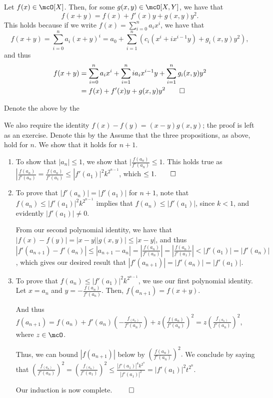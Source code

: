 \documentclass[a4paper, 12pt,oneside,openany]{book}
\begin{document}
Let $f(x) \in \mcO[X]$. Then, for some $g(x, y) \in \mcO[X, Y]$, we have that $$f(x+y)=f(x)+f'(x)y+g(x, y)y^2.$$ This holds because if we write $f(x)=\sum\limits_{i=0}^n a_ix^i$, we have that $$f(x+y)=\sum\limits_{i=0}^n a_i(x+y)^i = a_0+\sum\limits_{i=1}^n (c_i(x^i+ix^{i-1}y)+g_i(x, y)y^2),$$ and thus 
\begin{align*} f(x+y)&=\sum\limits_{i=0}^n a_i x^i+ \sum\limits_{i=1}^n ia_i x^{i-1} y + \sum\limits_{i=1}^n g_i (x, y) y^2 \\ &= f(x)+f'(x)y+g(x, y) y^2 \qed\end{align*} 

Denote the above by the 

We also require the identity $f(x)-f(y)=(x-y)g(x, y)$; the proof is left as an exercise. Denote this by the  Assume that the three propositions, as above, hold for $n$. We show that it holds for $n+1$. 

\begin{enumerate}
\item To show that $|a_n| \leq 1$, we show that $|\frac{f(a_n)}{f'(a_n)}\leq 1$. This holds true as $|\frac{f(a_n)}{f'(a_n)}=\frac{f(a_n)}{f'(a_1)}\leq|f'(a_1)|^2 k^{2^{n-1}}$, which $\leq 1. \qed$
\item To prove that $|f'(a_n)|=|f'(a_1)|$ for $n+1$, note that $f(a_n) \leq |f'(a_1)|^2 k^{2^{n-1}}$ implies that $f(a_n) \leq |f'(a_1)|$, since $k<1$, and evidently $|f'(a_1)| \neq 0$. 

From our second polynomial identity, we have that $|f(x)-f(y)| = |x-y||g(x, y)| \leq |x-y|$, and thus $|f'(a_{n+1})-f'(a_n)| \leq |a_{n+1}-a_n|=\left|\frac{f(a_n)}{f'(a_n)}\right|=\left|\frac{f(a_n)}{f'(a_1)}\right|<|f'(a_1)|=|f'(a_n)|$, which gives our desired result that $|f'(a_{n+1})|=|f'(a_n)|=|f'(a_1)|.$
\item To prove that $f(a_n) \leq |f'(a_1)|^2 k^{2^{n-1}}$, we use our first polynomial identity. Let $x=a_n$ and $y=-\frac{f(a_n)}{f'(a_n)}$. Then, $f(a_{n+1})=f(x+y)$.

And thus $f(a_{n+1})=f(a_n)+f'(a_n)\left(-\frac{f_(a_n)}{f'(a_n)}\right)+z\left(\frac{f(a_n)}{f'(a_n)}\right)^2=z\left(\frac{f_(a_n)}{f'(a_n)}\right)^2$, where $z\in\mcO$.

Thus, we can bound $|f(a_{n+1})|$ below by $\left(\frac{f(a_n)}{f'(a_n)}\right)^2.$ We conclude by saying that $\left(\frac{f_(a_n)}{f'(a_n)}\right)^2 =\left(\frac{f_(a_n)}{f'(a_1)}\right)^2 \leq \frac{|f'(a_1)|^4 k^{2^n}}{|f'(a_1)|^2}=|f'(a_1)|^2 t^{2^n}.$

Our induction is now complete. $\qed$
\end{enumerate}
\end{document}
